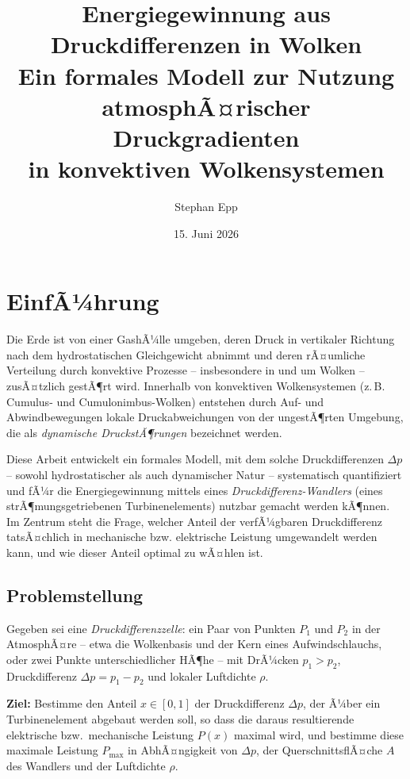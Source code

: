 ﻿\documentclass[a4paper,12pt]{article}
\title{Energiegewinnung aus Druckdifferenzen in Wolken\\[0.3em]
\large Ein formales Modell zur Nutzung atmosphÃ¤rischer Druckgradienten\\ in konvektiven Wolkensystemen}
\author{Stephan Epp}
\date{15. Juni 2026}
\theoremstyle{definition}
\begin{document}
\maketitle

\tableofcontents
\newpage

\section{EinfÃ¼hrung}

Die Erde ist von einer GashÃ¼lle umgeben, deren Druck in vertikaler Richtung
nach dem hydrostatischen Gleichgewicht abnimmt und deren rÃ¤umliche
Verteilung durch konvektive Prozesse -- insbesondere in und um Wolken --
zusÃ¤tzlich gestÃ¶rt wird. Innerhalb von konvektiven Wolkensystemen (z.\,B.
Cumulus- und Cumulonimbus-Wolken) entstehen durch Auf- und
Abwindbewegungen lokale Druckabweichungen von der ungestÃ¶rten Umgebung,
die als \emph{dynamische DruckstÃ¶rungen} bezeichnet werden.

Diese Arbeit entwickelt ein formales Modell, mit dem solche
Druckdifferenzen $\Delta p$ -- sowohl hydrostatischer als auch dynamischer
Natur -- systematisch quantifiziert und fÃ¼r die Energiegewinnung mittels
eines \emph{Druckdifferenz-Wandlers} (eines strÃ¶mungsgetriebenen
Turbinenelements) nutzbar gemacht werden kÃ¶nnen. Im Zentrum steht die
Frage, welcher Anteil der verfÃ¼gbaren Druckdifferenz tatsÃ¤chlich in
mechanische bzw. elektrische Leistung umgewandelt werden kann, und wie
dieser Anteil optimal zu wÃ¤hlen ist.

\subsection{Problemstellung}

Gegeben sei eine \emph{Druckdifferenzzelle}: ein Paar von Punkten $P_1$
und $P_2$ in der AtmosphÃ¤re -- etwa die Wolkenbasis und der Kern eines
Aufwindschlauchs, oder zwei Punkte unterschiedlicher HÃ¶he -- mit DrÃ¼cken
$p_1 > p_2$, Druckdifferenz $\Delta p = p_1 - p_2$ und lokaler Luftdichte
$\rho$.

\textbf{Ziel:} Bestimme den Anteil $x \in [0,1]$ der Druckdifferenz
$\Delta p$, der Ã¼ber ein Turbinenelement abgebaut werden soll, so dass die
daraus resultierende elektrische bzw.\ mechanische Leistung $P(x)$ maximal
wird, und bestimme diese maximale Leistung $P_{\max}$ in AbhÃ¤ngigkeit von
$\Delta p$, der QuerschnittsflÃ¤che $A$ des Wandlers und der Luftdichte
$\rho$.
\end{document}
